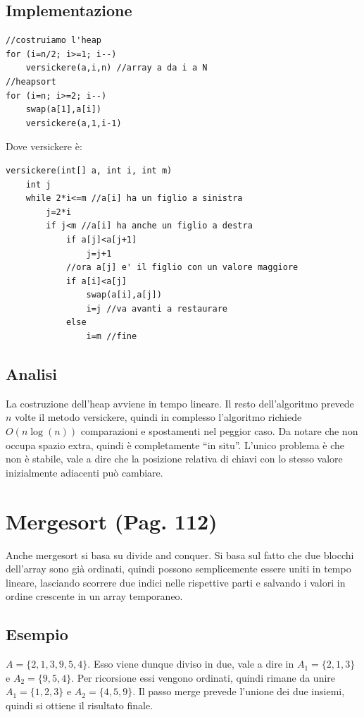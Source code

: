 \documentclass[a4paper]{book}
\newcommand{\lstIndent}{4}
\begin{document}
\subsection*{Implementazione}
\begin{lstlisting}[tabsize=\lstIndent]
//costruiamo l'heap
for (i=n/2; i>=1; i--)
	versickere(a,i,n) //array a da i a N
//heapsort	
for (i=n; i>=2; i--)
	swap(a[1],a[i])
	versickere(a,1,i-1)
\end{lstlisting}                                                                          
Dove versickere è:
\begin{lstlisting}[tabsize=\lstIndent]
versickere(int[] a, int i, int m)
	int j
	while 2*i<=m //a[i] ha un figlio a sinistra
		j=2*i
		if j<m //a[i] ha anche un figlio a destra
			if a[j]<a[j+1]
				j=j+1
			//ora a[j] e' il figlio con un valore maggiore
			if a[i]<a[j]
				swap(a[i],a[j])
				i=j //va avanti a restaurare
			else
				i=m //fine		
\end{lstlisting}                                                                                                 
\subsection*{Analisi}
La costruzione dell'heap avviene in tempo lineare. Il resto dell'algoritmo prevede $n$ volte il metodo versickere, quindi in complesso l'algoritmo richiede $O(n \log (n))$ comparazioni e spostamenti nel peggior caso. Da notare che non occupa spazio extra, quindi è completamente ``in situ''. L'unico problema è che non è stabile, vale a dire che la posizione relativa di chiavi con lo stesso valore inizialmente adiacenti può cambiare. 

\section{Mergesort (Pag. 112)}
Anche mergesort si basa su divide and conquer. Si basa sul fatto che due blocchi dell'array sono già ordinati, quindi possono semplicemente essere uniti in tempo lineare, lasciando scorrere due indici nelle rispettive parti e salvando i valori in ordine crescente in un array temporaneo.

\subsection*{Esempio}
$A=\{2, 1, 3, 9, 5, 4\}$. Esso viene dunque diviso in due, vale a dire in $A_1 =\{2,1,3\}$ e $A_2 =\{9,5,4\}$. Per ricorsione essi vengono ordinati, quindi rimane da unire $A_1 =\{1,2,3\}$ e $A_2 =\{4,5,9\}$. Il passo merge prevede l'unione dei due insiemi, quindi si ottiene il risultato finale.
\end{document}
